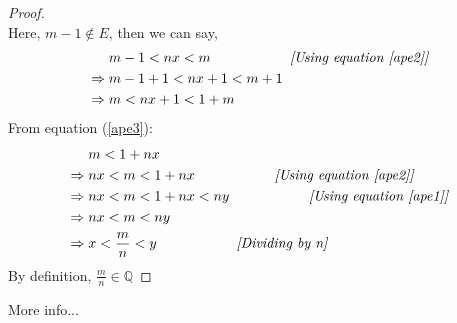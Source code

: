\documentclass{article}
\newcommand{\Rw}{\Rightarrow}
\newcommand{\hs}{\hspace}
\begin{document}
\begin{theorem}{}{}
\begin{proof}
\begin{equation}
        \end{equation}
        Here, $m-1\notin E$, then we can say,
        \begin{align}
            &m-1<nx<m \hs{2cm} \textit{[Using equation \ref{ape2}]}\nonumber\\
            \Rw \; & m-1+1 < nx+1<m+1 \nonumber\\
            \Rw \; & m<nx+1<1+m \label{ape3}
        \end{align}
        From equation (\ref{ape3}):\\
        \begin{align*}
            &m<1+nx\\
            \Rw \; & nx <m<1+nx \hs{2cm}\textit{[Using equation \ref{ape2}]}\\
            \Rw \; & nx<m<1+nx<ny \hs{2cm}\textit{[Using equation \ref{ape1}]}\\
            \Rw \; &  nx<m<ny\\
            \Rw \; & x<\frac{m}{n}<y \hs{2cm}\textit{[Dividing by n]}\\
        \end{align*}
        By definition, $\frac{m}{n}\in \mathbb{Q}$
    \end{proof}
\end{theorem}
More info...
\end{document}
